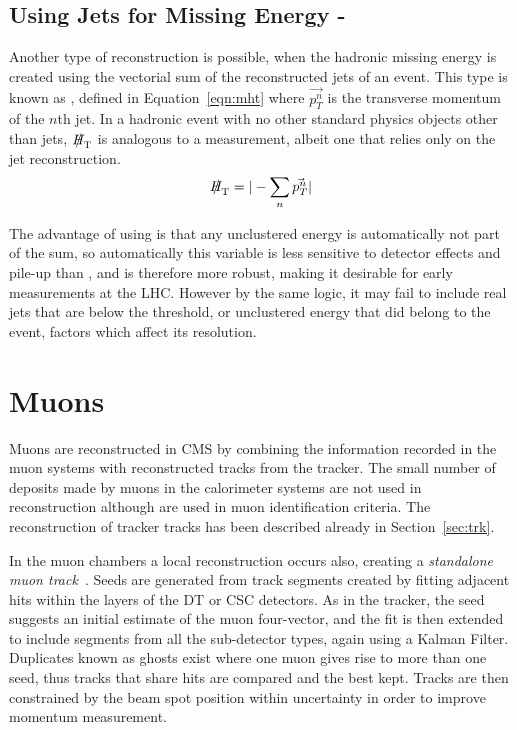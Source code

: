 \subsection{Using Jets for Missing Energy - \MHTh}

Another type of \met reconstruction is possible, when the hadronic missing energy is created using the vectorial sum of the reconstructed jets of an event. This type is known as \MHT, defined in Equation~\ref{eqn:mht} where $\vec{p_{T}^{n}}$ is the transverse momentum of the $n$th jet.  In a hadronic event with no other standard physics objects other than jets, $\MHT$ is analogous to a \met measurement, albeit one that relies only on the jet reconstruction. 
\begin{equation}
\MHT = | - \sum_{n} \vec{p_{T}^{n}}|
\label{eqn:mht}
\end{equation}

The advantage of using \MHT is that any unclustered energy is automatically not part of the sum, so automatically this variable is less sensitive to detector effects and pile-up than \met, and is therefore more robust, making it desirable for early measurements at the LHC. However by the same logic, it may fail to include real jets that are below the threshold, or unclustered energy that did belong to the event, factors which affect its resolution. 

\section{Muons}
\label{sec:muona}
Muons are reconstructed in CMS by combining the information recorded in the muon systems with reconstructed tracks from the tracker. The small number of deposits made by muons in the calorimeter systems are not used in reconstruction although are used in muon identification criteria. The reconstruction of tracker tracks has been described already in Section~\ref{sec:trk}. 

In the muon chambers a local reconstruction occurs also, creating a \textit{standalone muon track}~\cite{muonperf}. Seeds are generated from track segments created by fitting adjacent hits within the layers of the DT or CSC detectors. As in the tracker, the seed suggests an initial estimate of the muon four-vector, and the fit is then extended to include segments from all the sub-detector types, again using a Kalman Filter. Duplicates known as ghosts exist where one muon gives rise to more than one seed, thus tracks that share hits are compared and the best kept. Tracks are then constrained by the beam spot position within uncertainty in order to improve momentum measurement. 

